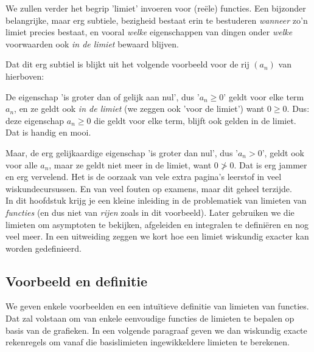 \documentclass{ximera}
\begin{document}
\begin{expandable}
\begin{uitweiding}
We zullen verder het begrip 'limiet' invoeren voor (reële) functies. Een bijzonder belangrijke, maar erg subtiele, bezigheid bestaat erin te bestuderen \textit{wanneer} zo'n limiet precies bestaat, en vooral \textit{welke} eigenschappen van dingen onder \textit{welke} voorwaarden ook \textit{in de limiet} bewaard blijven. 

Dat dit erg subtiel is blijkt uit het volgende voorbeeld voor de rij $(a_n)$ van hierboven:

De eigenschap 'is groter dan of gelijk aan nul', dus '$a_n\geq0$' geldt voor elke term $a_n$, en ze geldt ook \textit{in de limiet} (we zeggen ook 'voor de limiet') want  $0\geq0$. Dus: deze eigenschap $a_n\geq 0$ die geldt voor elke term, blijft ook gelden in de limiet. Dat is handig en mooi. 

Maar, de erg gelijkaardige eigenschap 'is groter dan nul', dus '$a_n>0$', geldt ook voor alle $a_n$, maar ze geldt niet meer in de limiet, want $0\not>0$. Dat is erg jammer en erg vervelend. Het is de oorzaak van vele extra pagina's leerstof in veel wiskundecursussen.  En van veel fouten op examens, maar dit geheel terzijde. \\


In dit hoofdstuk krijg je een kleine inleiding in de problematiek van limieten van \textit{functies} (en dus niet van \textit{rijen} zoals in dit voorbeeld). Later gebruiken we die limieten om asymptoten te bekijken, afgeleiden en integralen te definiëren en nog veel meer. In een uitweiding zeggen we kort hoe een limiet wiskundig exacter kan worden gedefinieerd.

\end{uitweiding}

\end{expandable}


\subsection{Voorbeeld en definitie}

We geven enkele voorbeelden en een intuïtieve definitie van limieten van functies. Dat zal volstaan om van enkele eenvoudige functies de limieten te bepalen op basis van de grafieken. In een volgende paragraaf geven we dan wiskundig exacte rekenregels om vanaf die basislimieten ingewikkeldere limieten te berekenen.
\end{document}
